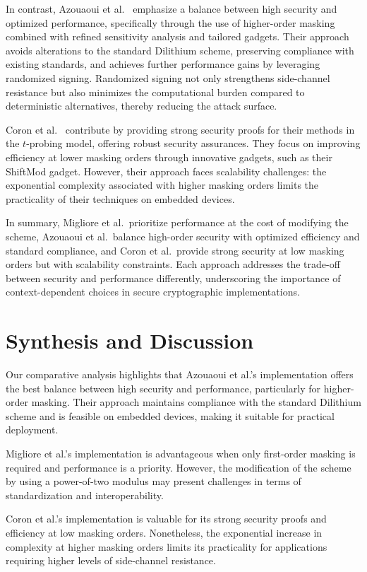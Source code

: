 In contrast, Azouaoui et al.\ \cite{Azouaoui22} emphasize a balance between high security and optimized performance, specifically through the use of higher-order masking combined with refined sensitivity analysis and tailored gadgets. Their approach avoids alterations to the standard Dilithium scheme, preserving compliance with existing standards, and achieves further performance gains by leveraging randomized signing. Randomized signing not only strengthens side-channel resistance but also minimizes the computational burden compared to deterministic alternatives, thereby reducing the attack surface.

Coron et al.\ \cite{Coron23} contribute by providing strong security proofs for their methods in the $t$-probing model, offering robust security assurances. They focus on improving efficiency at lower masking orders through innovative gadgets, such as their ShiftMod gadget. However, their approach faces scalability challenges: the exponential complexity associated with higher masking orders limits the practicality of their techniques on embedded devices.

In summary, Migliore et al.\ prioritize performance at the cost of modifying the scheme, Azouaoui et al.\ balance high-order security with optimized efficiency and standard compliance, and Coron et al.\ provide strong security at low masking orders but with scalability constraints. Each approach addresses the trade-off between security and performance differently, underscoring the importance of context-dependent choices in secure cryptographic implementations.

\section{Synthesis and Discussion}

Our comparative analysis highlights that Azouaoui et al.'s implementation offers the best balance between high security and performance, particularly for higher-order masking. Their approach maintains compliance with the standard Dilithium scheme and is feasible on embedded devices, making it suitable for practical deployment.

Migliore et al.'s implementation is advantageous when only first-order masking is required and performance is a priority. However, the modification of the scheme by using a power-of-two modulus may present challenges in terms of standardization and interoperability.

Coron et al.'s implementation is valuable for its strong security proofs and efficiency at low masking orders. Nonetheless, the exponential increase in complexity at higher masking orders limits its practicality for applications requiring higher levels of side-channel resistance.


